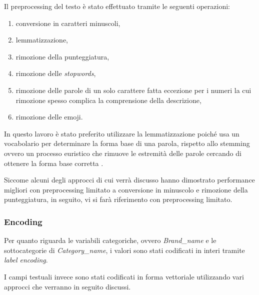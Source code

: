 Il preprocessing del testo è stato effettuato tramite le seguenti operazioni:
\begin{enumerate}
    \item conversione in caratteri minuscoli,
    \item lemmatizzazione,
    \item rimozione della punteggiatura,
    \item rimozione delle \textit{stopwords},
    \item rimozione delle parole di un solo carattere fatta eccezione per i
    numeri la cui rimozione spesso complica la comprensione della descrizione,
    \item rimozione delle emoji.
\end{enumerate}
In questo lavoro è stato preferito utilizzare la lemmatizzazione poiché usa un
vocabolario per determinare la forma base di una parola, rispetto allo stemming
ovvero un processo euristico che rimuove le estremità delle parole cercando di
ottenere la forma base corretta \cite{balakrishnan2014stemming}. 

Siccome alcuni degli approcci di cui verrà discusso hanno dimostrato performance
migliori con preprocessing limitato a conversione in minuscolo e rimozione della
punteggiatura, in seguito, vi si farà riferimento con preprocessing limitato.

\subsubsection{Encoding}

Per quanto riguarda le variabili categoriche, ovvero \textit{Brand\_name} e le
sottocategorie di \textit{Category\_name},
i valori sono stati codificati in interi tramite \textit{label encoding}.

I campi testuali invece sono stati codificati in forma vettoriale utilizzando
vari approcci che verranno in seguito discussi.


